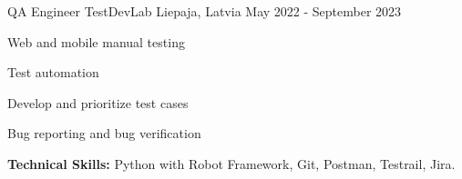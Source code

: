 

\begin{cventries}

  \cventry
    {QA Engineer} %
    {TestDevLab} %
    {Liepaja, Latvia} %
    {May 2022 - September 2023} %
    {
      \begin{cvitems} %
        \item {Web and mobile manual testing}
        \item {Test automation}
        \item {Develop and prioritize test cases}
        \item {Bug reporting and bug verification}
        \item {\textbf{Technical Skills:} Python with Robot Framework, Git, Postman, Testrail, Jira.}
      \end{cvitems}
    }

\end{cventries}
